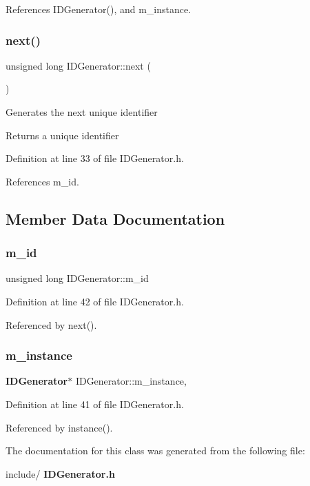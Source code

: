 References I\+D\+Generator(), and m\+\_\+instance.

\mbox{\label{class_i_d_generator_a99d8cabb2ec6a17888a8ccbe9c85fee0}} 
\subsubsection{next()}
{\footnotesize\ttfamily unsigned long I\+D\+Generator\+::next (\begin{DoxyParamCaption}{ }\end{DoxyParamCaption})\hspace{0.3cm}{\ttfamily [inline]}}

Generates the next unique identifier \begin{DoxyReturn}{Returns}
a unique identifier 
\end{DoxyReturn}


Definition at line 33 of file I\+D\+Generator.\+h.



References m\+\_\+id.



\subsection{Member Data Documentation}
\mbox{\label{class_i_d_generator_ad0400380525f694b23ff675f4f170893}} 
\subsubsection{m\_id}
{\footnotesize\ttfamily unsigned long I\+D\+Generator\+::m\+\_\+id\hspace{0.3cm}{\ttfamily [private]}}



Definition at line 42 of file I\+D\+Generator.\+h.



Referenced by next().

\mbox{\label{class_i_d_generator_a316bacdda67f4cf9bf73fcbd9bf94245}} 
\subsubsection{m\_instance}
{\footnotesize\ttfamily \textbf{ I\+D\+Generator}$\ast$ I\+D\+Generator\+::m\+\_\+instance\hspace{0.3cm}{\ttfamily [static]}, {\ttfamily [private]}}



Definition at line 41 of file I\+D\+Generator.\+h.



Referenced by instance().



The documentation for this class was generated from the following file\+:\begin{DoxyCompactItemize}
\item 
include/\textbf{ I\+D\+Generator.\+h}\end{DoxyCompactItemize}
